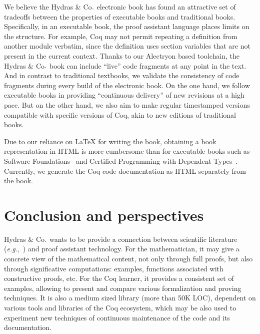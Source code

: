 \documentclass{easychair}
\newcommand{\TODO}[2][]{[\textcolor{red}{TODO (#1):} \emph{#2}]}
\newcommand{\coq}{Coq\xspace}
\newcommand{\alectr}{Alectryon\xspace}
\newcommand{\Hydras}{Hydras \& Co$\text.$\xspace}
\begin{document}
We believe the \Hydras electronic book has found an attractive set of tradeoffs between the properties of executable books and traditional books. Specifically, in an executable book, the proof assistant language places limits on the structure. For example, Coq may not permit repeating a definition from another module verbatim, since the definition uses section variables that are not present in the current context. Thanks to our \alectr based toolchain, the \Hydras book can include ``live'' code fragments at any point in the text. And in contrast to traditional textbooks, we validate the consistency of code fragments during every build of the electronic book. On the one hand, we follow executable books in providing ``continuous delivery'' of new revisions at a high pace. But on the other hand, we also aim to make regular timestamped versions compatible with specific versions of Coq, akin to new editions of traditional books.

Due to our reliance on LaTeX for writing the book, obtaining a book representation in HTML is more cumbersome than for executable books such as Software Foundations~\cite{SF} and Certified Programming with Dependent Types~\cite{chlipalacpdt2011}. Currently, we generate the Coq code documentation as HTML separately from the book.

\section{Conclusion and perspectives}


\Hydras wants to be provide a connection between scientific literature (\emph{e.g.},~\cite{KP82, KS81, schutte}) and proof assistant technology. For the mathematician, it may give a concrete view of the mathematical content, not only through full proofs, but also through significative computations: examples, functions associated with constructive proofs, etc. For the \coq learner, it provides a consistent set of examples,
allowing to present and compare various formalization and proving techniques. %
It is also a medium sized library (more than 50K LOC), dependent on various tools and libraries of the \coq ecosystem, which  may be also used to experiment new techniques of continuous maintenance of the code and its documentation.





\end{document}

